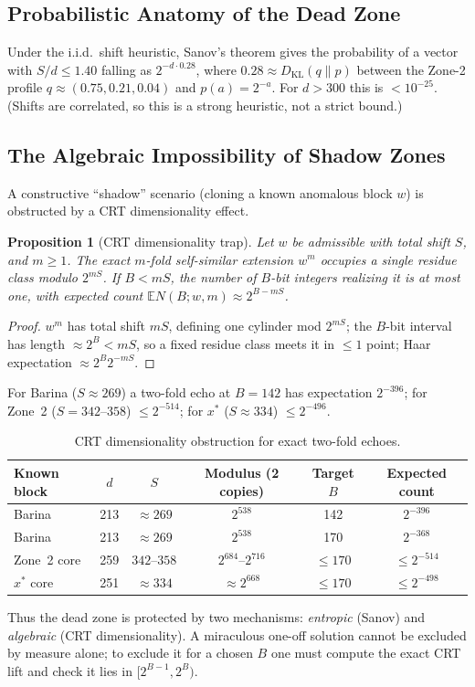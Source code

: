 \documentclass[12pt,a4paper]{article}
\newtheorem{proposition}[theorem]{Proposition}
\theoremstyle{remark}
\begin{document}
\subsection{Probabilistic Anatomy of the Dead Zone}
Under the i.i.d.\ shift heuristic, Sanov's theorem gives the probability of a vector with $S/d\le1.40$ falling as $2^{-d\cdot0.28}$, where $0.28\approx D_{\mathrm{KL}}(q\|p)$ between the Zone-2 profile $q\approx(0.75,0.21,0.04)$ and $p(a)=2^{-a}$. For $d>300$ this is $<10^{-25}$. (Shifts are correlated, so this is a strong heuristic, not a strict bound.)

\subsection{The Algebraic Impossibility of Shadow Zones}
A constructive ``shadow'' scenario (cloning a known anomalous block $w$) is obstructed by a CRT dimensionality effect.
\begin{proposition}[CRT dimensionality trap]
Let $w$ be admissible with total shift $S$, and $m\ge1$. The exact $m$-fold self-similar extension $w^m$ occupies a single residue class modulo $2^{mS}$. If $B<mS$, the number of $B$-bit integers realizing it is at most one, with expected count $\mathbb E N(B;w,m)\approx2^{B-mS}$.
\end{proposition}
\begin{proof}
$w^m$ has total shift $mS$, defining one cylinder mod $2^{mS}$; the $B$-bit interval has length $\approx2^B<mS$, so a fixed residue class meets it in $\le1$ point; Haar expectation $\approx2^B2^{-mS}$.
\end{proof}
For Barina ($S\approx269$) a two-fold echo at $B=142$ has expectation $2^{-396}$; for Zone~2 ($S=342$--$358$) $\le2^{-514}$; for $x^*$ ($S\approx334$) $\le2^{-496}$.
\begin{table}[h]
\centering
\caption{CRT dimensionality obstruction for exact two-fold echoes.}
\begin{tabular}{lccccc}
\toprule
\textbf{Known block} & $d$ & $S$ & \textbf{Modulus (2 copies)} & \textbf{Target} $B$ & \textbf{Expected count} \\
\midrule
Barina & 213 & $\approx269$ & $2^{538}$ & 142 & $2^{-396}$ \\
Barina & 213 & $\approx269$ & $2^{538}$ & 170 & $2^{-368}$ \\
Zone~2 core & 259 & $342\text{--}358$ & $2^{684}\text{--}2^{716}$ & $\le170$ & $\le2^{-514}$ \\
$x^*$ core & 251 & $\approx334$ & $\approx2^{668}$ & $\le170$ & $\le2^{-498}$ \\
\bottomrule
\end{tabular}
\end{table}
Thus the dead zone is protected by two mechanisms: \emph{entropic} (Sanov) and \emph{algebraic} (CRT dimensionality). A miraculous one-off solution cannot be excluded by measure alone; to exclude it for a chosen $B$ one must compute the exact CRT lift and check it lies in $[2^{B-1},2^B)$.
\end{document}
